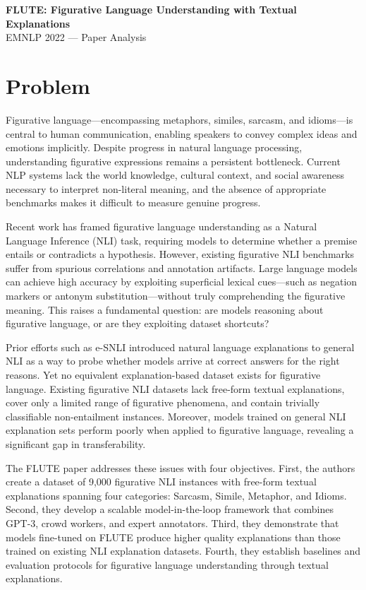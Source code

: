 \documentclass[12pt]{article}
\begin{document}
\begin{center}
\textbf{\Large FLUTE: Figurative Language Understanding with Textual Explanations}\\[0.5em]
\large EMNLP 2022 --- Paper Analysis
\end{center}

\section{Problem}

Figurative language---encompassing metaphors, similes, sarcasm, and idioms---is central to human communication, enabling speakers to convey complex ideas and emotions implicitly. Despite progress in natural language processing, understanding figurative expressions remains a persistent bottleneck. Current NLP systems lack the world knowledge, cultural context, and social awareness necessary to interpret non-literal meaning, and the absence of appropriate benchmarks makes it difficult to measure genuine progress.

Recent work has framed figurative language understanding as a Natural Language Inference (NLI) task, requiring models to determine whether a premise entails or contradicts a hypothesis. However, existing figurative NLI benchmarks suffer from spurious correlations and annotation artifacts. Large language models can achieve high accuracy by exploiting superficial lexical cues---such as negation markers or antonym substitution---without truly comprehending the figurative meaning. This raises a fundamental question: are models reasoning about figurative language, or are they exploiting dataset shortcuts?

Prior efforts such as e-SNLI introduced natural language explanations to general NLI as a way to probe whether models arrive at correct answers for the right reasons. Yet no equivalent explanation-based dataset exists for figurative language. Existing figurative NLI datasets lack free-form textual explanations, cover only a limited range of figurative phenomena, and contain trivially classifiable non-entailment instances. Moreover, models trained on general NLI explanation sets perform poorly when applied to figurative language, revealing a significant gap in transferability.

The FLUTE paper addresses these issues with four objectives. First, the authors create a dataset of 9,000 figurative NLI instances with free-form textual explanations spanning four categories: Sarcasm, Simile, Metaphor, and Idioms. Second, they develop a scalable model-in-the-loop framework that combines GPT-3, crowd workers, and expert annotators. Third, they demonstrate that models fine-tuned on FLUTE produce higher quality explanations than those trained on existing NLI explanation datasets. Fourth, they establish baselines and evaluation protocols for figurative language understanding through textual explanations.
\end{document}
